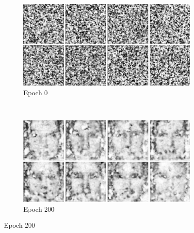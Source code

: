 \begin{figure}
    \centering
    \begin{subfigure}[b]{0.45\textwidth}
        \includegraphics[width=\textwidth]{fig/dcgan/caltech/epoch0}
        \caption{Epoch 0}
    \end{subfigure}
    ~
    \begin{subfigure}[b]{0.45\textwidth}
        \includegraphics[width=\textwidth]{fig/dcgan/caltech/epoch200}
        \caption{Epoch 200}
    \end{subfigure}


\end{figure}
